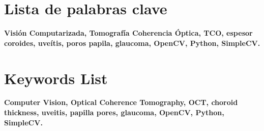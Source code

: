 \chapter*{Lista de palabras clave}
\textbf{Visión Computarizada, Tomografía Coherencia Óptica, TCO,
  espesor coroides, uveítis, poros papila, glaucoma, OpenCV,
  \mbox{Python}, SimpleCV.}
\chapter*{Keywords List}
\textbf{Computer Vision, Optical Coherence Tomography, OCT, choroid
  thickness, uveitis, papilla pores, glaucoma, OpenCV, Python,
  SimpleCV.}
